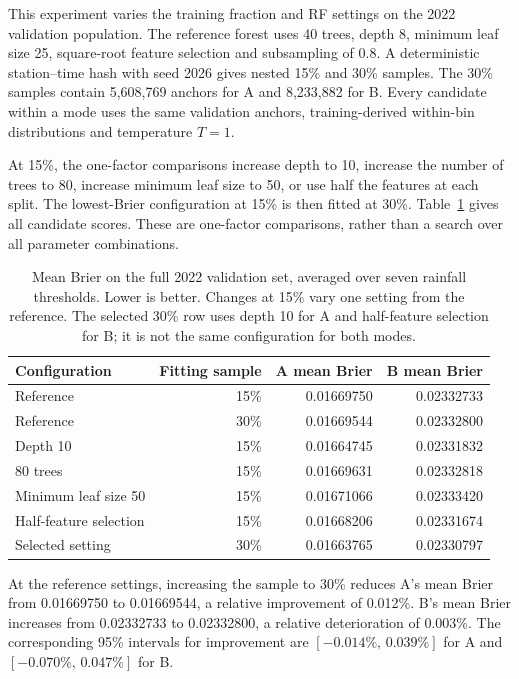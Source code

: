 \documentclass[11pt,a4paper]{article}
\begin{document}
This experiment varies the training fraction and RF settings on the 2022 validation population. The reference forest uses 40 trees, depth 8, minimum leaf size 25, square-root feature selection and subsampling of 0.8. A deterministic station--time hash with seed 2026 gives nested 15\% and 30\% samples. The 30\% samples contain 5,608,769 anchors for A and 8,233,882 for B. Every candidate within a mode uses the same validation anchors, training-derived within-bin distributions and temperature $T=1$.

At 15\%, the one-factor comparisons increase depth to 10, increase the number of trees to 80, increase minimum leaf size to 50, or use half the features at each split. The lowest-Brier configuration at 15\% is then fitted at 30\%. Table~\ref{tab:rfsensitivity} gives all candidate scores. These are one-factor comparisons, rather than a search over all parameter combinations.

\par
\begin{table}[htbp]\centering\small
\begin{tabular}{lrrr}\toprule
Configuration & Fitting sample & A mean Brier & B mean Brier\\\midrule
Reference & 15\% & 0.01669750 & 0.02332733 \\
Reference & 30\% & 0.01669544 & 0.02332800 \\
Depth 10 & 15\% & 0.01664745 & 0.02331832 \\
80 trees & 15\% & 0.01669631 & 0.02332818 \\
Minimum leaf size 50 & 15\% & 0.01671066 & 0.02333420 \\
Half-feature selection & 15\% & 0.01668206 & 0.02331674 \\
Selected setting & 30\% & 0.01663765 & 0.02330797 \\
\bottomrule\end{tabular}
\caption{Mean Brier on the full 2022 validation set, averaged over seven rainfall thresholds. Lower is better. Changes at 15\% vary one setting from the reference. The selected 30\% row uses depth 10 for A and half-feature selection for B; it is not the same configuration for both modes.}
\label{tab:rfsensitivity}\end{table}\par


At the reference settings, increasing the sample to 30\% reduces A's mean Brier from 0.01669750 to 0.01669544, a relative improvement of 0.012\%. B's mean Brier increases from 0.02332733 to 0.02332800, a relative deterioration of 0.003\%. The corresponding 95\% intervals for improvement are $[-0.014\%,\,0.039\%]$ for A and $[-0.070\%,\,0.047\%]$ for B.
\end{document}
